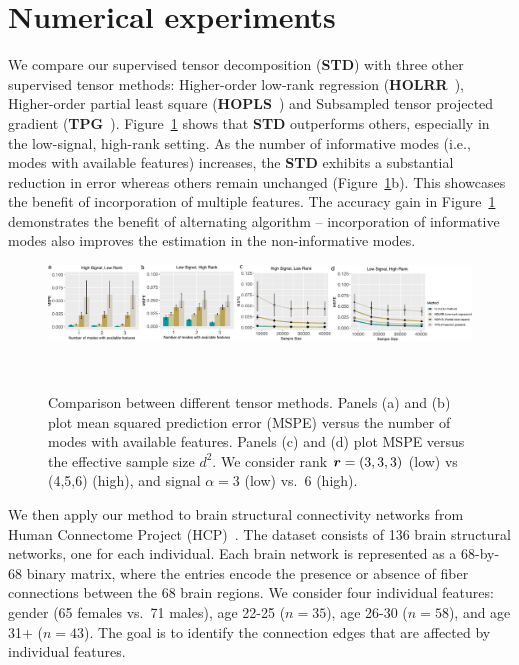 \documentclass{article}
\theoremstyle{definition}
\theoremstyle{definition}
\begin{document}
\section{Numerical experiments}
We compare our supervised tensor decomposition ({\bf STD}) with three other supervised tensor methods: Higher-order low-rank regression ({\bf HOLRR}~\cite{rabusseau2016low}), Higher-order partial least square ({\bf HOPLS}~\cite{zhao2012higher}) and Subsampled tensor projected gradient ({\bf TPG}~\cite{yu2016learning}). Figure~\ref{fig:compare} shows that {\bf STD} outperforms others, especially in the low-signal, high-rank setting. As the number of informative modes (i.e., modes with available features) increases, the {\bf STD} exhibits a substantial reduction in error whereas others remain unchanged (Figure~\ref{fig:compare}b). This showcases the benefit of incorporation of multiple features. The accuracy gain in Figure~\ref{fig:compare} demonstrates the benefit of alternating algorithm -- incorporation of informative modes also improves the estimation in the non-informative modes. 

\begin{figure}[ht]
\centering
\includegraphics[width=14cm]{compare_alternative_w.pdf} 
\vspace{-.5cm}
\caption{\small Comparison between different tensor methods. Panels (a) and (b) plot mean squared prediction error (MSPE) versus the number of modes with available features. Panels (c) and (d) plot MSPE versus the effective sample size $d^2$. We consider rank $\bm{r}=(3,3,3)$ (low) vs (4,5,6)
 (high), and signal $\alpha =3 $ (low) vs.\ 6 (high).}~\label{fig:compare}
\vspace{-.5cm}
\end{figure}



We then apply our method to brain structural connectivity networks from Human Connectome Project (HCP)~\citep{HCP}. %
The dataset consists of 136 brain structural networks, one for each individual. Each brain network is represented as a 68-by-68 binary matrix, where the entries encode the presence or absence of fiber connections between the 68 brain regions. We consider four individual features: gender (65 females vs.\ 71 males), age 22-25 ($n=35$), age 26-30 ($n=58$), and age 31+ ($n=43$). The goal is to identify the connection edges that are affected by individual features. 
\end{document}
